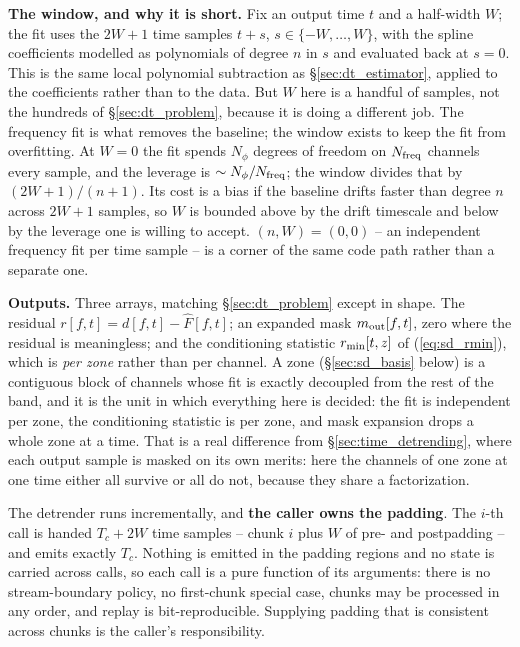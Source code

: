 \documentclass{article}
\numberwithin{equation}{section}   %
\begin{document}
{\bf The window, and why it is short.}  Fix an output time $t$ and a half-width $W$; the fit uses the $2W+1$
time samples $t+s$, $s \in \{-W,\ldots,W\}$, with the spline coefficients modelled as polynomials of degree $n$
in $s$ and evaluated back at $s = 0$.  This is the same local polynomial subtraction as
\S\ref{sec:dt_estimator}, applied to the coefficients rather than to the data.  But $W$ here is a handful of
samples, not the hundreds of \S\ref{sec:dt_problem}, because it is doing a different job.  The frequency fit is
what removes the baseline; the window exists to keep the fit from overfitting.  At $W=0$ the fit spends
$N_\phi$ degrees of freedom on $N_{\rm freq}$ channels every sample, and the leverage is $\sim N_\phi/N_{\rm
freq}$; the window divides that by $(2W+1)/(n+1)$.  Its cost is a bias if the baseline drifts faster than
degree $n$ across $2W+1$ samples, so $W$ is bounded above by the drift timescale and below by the leverage one
is willing to accept.  $(n,W) = (0,0)$ -- an independent frequency fit per time sample -- is a corner of the
same code path rather than a separate one.

{\bf Outputs.}  Three arrays, matching \S\ref{sec:dt_problem} except in shape.  The residual
$r[f,t] = d[f,t] - \hat F[f,t]$; an expanded mask $m_{\rm out}[f,t]$, zero where the residual is meaningless;
and the conditioning statistic $r_{\rm min}[t,z]$ of (\ref{eq:sd_rmin}), which is {\em per zone} rather than
per channel.  A zone (\S\ref{sec:sd_basis} below) is a contiguous block of channels whose fit is exactly
decoupled from the rest of the band, and it is the unit in which everything here is decided: the fit is
independent per zone, the conditioning statistic is per zone, and mask expansion drops a whole zone at a time.
That is a real difference from \S\ref{sec:time_detrending}, where each output sample is masked on its own
merits: here the channels of one zone at one time either all survive or all do not, because they share a
factorization.

The detrender runs incrementally, and {\bf the caller owns the padding}.  The $i$-th call is handed
$T_c + 2W$ time samples -- chunk $i$ plus $W$ of pre- and postpadding -- and emits exactly $T_c$.  Nothing is
emitted in the padding regions and no state is carried across calls, so each call is a pure function of its
arguments: there is no stream-boundary policy, no first-chunk special case, chunks may be processed in any
order, and replay is bit-reproducible.  Supplying padding that is consistent across chunks is the caller's
responsibility.
\end{document}
